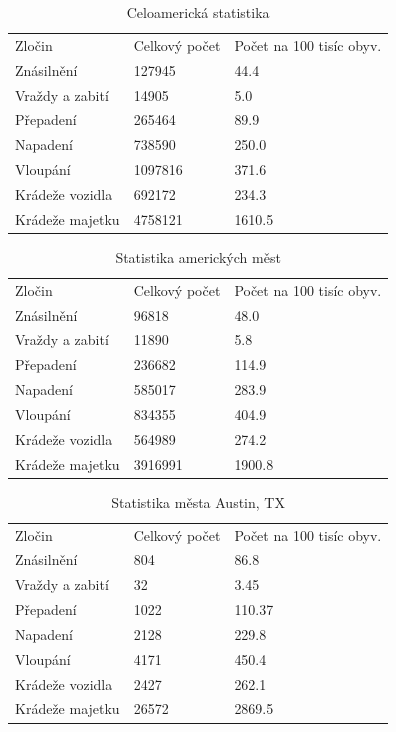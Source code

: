 \documentclass{article}
\begin{document}
\begin{table}
  \centering
  \caption{Celoamerická statistika}
  \label{tab:us_crime}
  \begin{tabular}{ |l|l|l| }
  \hline
      Zločin & Celkový počet & Počet na 100 tisíc obyv. \\
      Znásilnění & 127945 & 44.4 \\
      Vraždy a zabití & 14905 & 5.0 \\
      Přepadení & 265464 & 89.9 \\
      Napadení & 738590 & 250.0 \\ 
      Vloupání & 1097816 & 371.6 \\
      Krádeže vozidla & 692172 & 234.3 \\ 
      Krádeže majetku & 4758121 & 1610.5 \\
  \hline
  \end{tabular}
\end{table}

\begin{table}
  \centering
  \caption{Statistika amerických měst}
  \label{tab:cities_crime}
  \begin{tabular}{ |l|l|l| }
  \hline
      Zločin & Celkový počet & Počet na 100 tisíc obyv. \\
      Znásilnění & 96818 & 48.0 \\
      Vraždy a zabití & 11890 & 5.8 \\
      Přepadení & 236682 & 114.9 \\
      Napadení & 585017 & 283.9 \\ 
      Vloupání & 834355 & 404.9 \\
      Krádeže vozidla & 564989 & 274.2 \\ 
      Krádeže majetku & 3916991 & 1900.8 \\
  \hline
  \end{tabular}
\end{table}

\begin{table}
  \centering
  \caption{Statistika města Austin, TX}
  \label{tab:austin_crime}
  \begin{tabular}{ |l|l|l| }
  \hline
      Zločin & Celkový počet & Počet na 100 tisíc obyv. \\
      Znásilnění & 804 & 86.8 \\
      Vraždy a zabití & 32 & 3.45 \\
      Přepadení & 1022 & 110.37 \\
      Napadení & 2128 & 229.8 \\ 
      Vloupání & 4171 & 450.4 \\
      Krádeže vozidla & 2427 & 262.1 \\ 
      Krádeže majetku & 26572 & 2869.5 \\
  \hline
  \end{tabular}
\end{table}
\end{document}
